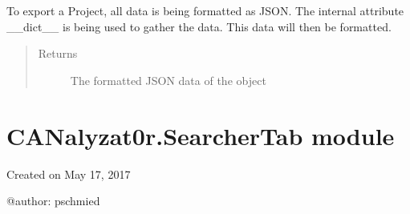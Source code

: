 \documentclass[letterpaper,10pt,english]{sphinxmanual}
\begin{document}
\begin{fulllineitems}
\begin{fulllineitems}
\begin{quote}
\begin{description}
\end{description}\end{quote}

\end{fulllineitems}


\begin{fulllineitems}
\label{\detokenize{src:src.Project.Project.toJSON}}
To export a Project, all data is being formatted as JSON.
The internal attribute \_\_dict\_\_ is being used to gather the data.
This data will then be formatted.
\begin{quote}\begin{description}
\item[{Returns}] \leavevmode
The formatted JSON data of the object

\end{description}\end{quote}

\end{fulllineitems}


\end{fulllineitems}



\section{CANalyzat0r.SearcherTab module}
\label{\detokenize{src:canalyzat0r-searchertab-module}}\label{\detokenize{src:module-src.SearcherTab}}
Created on May 17, 2017

@author: pschmied
\end{document}
